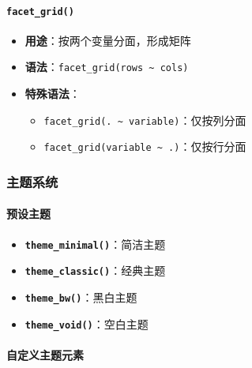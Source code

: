 \documentclass[
  twoside]{book}
\providecommand{\tightlist}{%
  \setlength{\itemsep}{0pt}\setlength{\parskip}{0pt}}
\begin{document}
\hypertarget{facet_grid}{%
\paragraph{\texorpdfstring{\texttt{facet\_grid()}}{facet\_grid()}}\label{facet_grid}}

\begin{itemize}
\tightlist
\item
  \textbf{用途}：按两个变量分面，形成矩阵
\item
  \textbf{语法}：\texttt{facet\_grid(rows\ \textasciitilde{}\ cols)}
\item
  \textbf{特殊语法}：

  \begin{itemize}
  \tightlist
  \item
    \texttt{facet\_grid(.\ \textasciitilde{}\ variable)}：仅按列分面
  \item
    \texttt{facet\_grid(variable\ \textasciitilde{}\ .)}：仅按行分面
  \end{itemize}
\end{itemize}

\hypertarget{ux4e3bux9898ux7cfbux7edf}{%
\subsubsection{主题系统}\label{ux4e3bux9898ux7cfbux7edf}}

\hypertarget{ux9884ux8bbeux4e3bux9898}{%
\paragraph{预设主题}\label{ux9884ux8bbeux4e3bux9898}}

\begin{itemize}
\tightlist
\item
  \textbf{\texttt{theme\_minimal()}}：简洁主题
\item
  \textbf{\texttt{theme\_classic()}}：经典主题
\item
  \textbf{\texttt{theme\_bw()}}：黑白主题
\item
  \textbf{\texttt{theme\_void()}}：空白主题
\end{itemize}

\hypertarget{ux81eaux5b9aux4e49ux4e3bux9898ux5143ux7d20}{%
\paragraph{自定义主题元素}\label{ux81eaux5b9aux4e49ux4e3bux9898ux5143ux7d20}}
\end{document}
